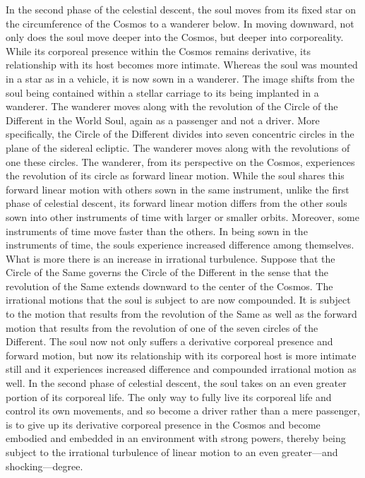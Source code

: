 In the second phase of the celestial descent, the soul moves from its fixed star on the circumference of the Cosmos to a wanderer below. In moving downward, not only does the soul move deeper into the Cosmos, but deeper into corporeality. While its corporeal presence within the Cosmos remains derivative, its relationship with its host becomes more intimate. Whereas the soul was mounted in a star as in a vehicle, it is now sown in a wanderer. The image shifts from the soul being contained within a stellar carriage to its being implanted in a wanderer. The wanderer moves along with the revolution of the Circle of the Different in the World Soul, again as a passenger and not a driver. More specifically, the Circle of the Different divides into seven concentric circles in the plane of the sidereal ecliptic. The wanderer moves along with the revolutions of one these circles. The wanderer, from its perspective on the Cosmos, experiences the revolution of its circle as forward linear motion. While the soul shares this forward linear motion with others sown in the same instrument, unlike the first phase of celestial descent, its forward linear motion differs from the other souls sown into other instruments of time with larger or smaller orbits. Moreover, some instruments of time move faster than the others. In being sown in the instruments of time, the souls experience increased difference among themselves. What is more there is an increase in irrational turbulence. Suppose that the Circle of the Same governs the Circle of the Different in the sense that the revolution of the Same extends downward to the center of the Cosmos. The irrational motions that the soul is subject to are now compounded. It is subject to the motion that results from the revolution of the Same as well as the forward motion that results from the revolution of one of the seven circles of the Different. The soul now not only suffers a derivative corporeal presence and forward motion, but now its relationship with its corporeal host is more intimate still and it experiences increased difference and compounded irrational motion as well. In the second phase of celestial descent, the soul takes on an even greater portion of its corporeal life. The only way to fully live its corporeal life and control its own movements, and so become a driver rather than a mere passenger, is to give up its derivative corporeal presence in the Cosmos and become embodied and embedded in an environment with strong powers, thereby being subject to the irrational turbulence of linear motion to an even greater---and shocking---degree. 

